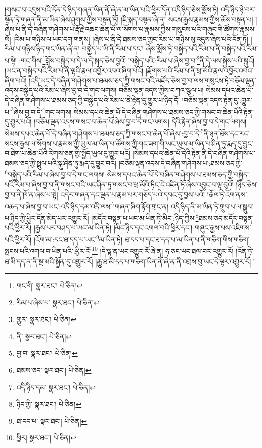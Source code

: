 །གསང་བ་འདུས་པའི་དོན་དེ་ཉིད་གཞན་ཡིན་ནོ་ཞེ་ན་མ་ཡིན་པའི་ཕྱིར་དོན་འདི་ཉིད་ཅེས་སྨོས་ཏེ། འདི་ཉིད་ཉེ་བར་སྟོན་ཏེ་གཞན་ནི་མ་ཡིན་ཞེས་ཤུགས་ཀྱིས་བསྟན་ཏོ། །ཇི་སྐད་བསྟན་ཞེ་ན། སངས་རྒྱས་རྣམས་ཀྱིས་ཆོས་བསྟན་པ། །ཞེས་པ་ནི་དེ་བཞིན་གཤེགས་པ་རྡོ་རྗེ་འཆང་ཆེན་པོ་ལ་སོགས་པ་རྣམས་ཀྱིས་གསུངས་པའི་གཞུང་གི་ཚོགས་རྣམས་སོ། །རིམ་པ་གཉིས་ལ་ཡང་དག་གནས། །ཞེས་པ་ནི་དེ་ཐམས་ཅད་ཀྱང་རིམ་པ་གཉིས་སུ་འདུས་ཞེས་པའི་དོན་ཏོ། །རིམ་པ་གཉིས་ཉིད་གང་ཡིན་ཞེ་ན། བསྐྱེད་པ་ཡི་ནི་རིམ་པ་དང་། ཞེས་སྨོས་ཏེ་བསྐྱེད་པའི་རིམ་པ་ནི་བསྐྱེད་པའི་རིམ་པ་སྟེ། :གང་གིས་\footnote{གང་གི་  སྣར་ཐང་།  པེ་ཅིན། }བློས་བསྐྱེད་པ་དེ་ལ་དེ་སྐད་ཅེས་བྱའོ། །བསྐྱེད་པའི་:རིམ་པ་ཞེས་བྱ་བ་\footnote{རིམ་པ་ཞེས་པ་  སྣར་ཐང་།  པེ་ཅིན། }ནི་དེ་ལས་སྐྱེས་པའི་སྐུའོ། །ཡང་ན་བསྐྱེད་པའི་རིམ་པ་ནི་ལྷའི་རྣལ་འབྱོར་འབའ་ཞིག་པའོ། །རྫོགས་པའི་རིམ་པ་ནི་ཕྲ་མོའི་རྣལ་འབྱོར་འབའ་ཞིག་པའོ། །འདི་ཡང་དེ་བཞིན་གཤེགས་པ་ཐམས་ཅད་ཀྱི་གསང་བའི་མཛོད་ཅེས་བྱ་བ་ལས་གསུངས་ཏེ་བཅོམ་ལྡན་འདས་བསྐྱེད་པའི་རིམ་པ་ཞེས་བྱ་བ་དེ་གང་ལགས། བཅོམ་ལྡན་འདས་ཀྱིས་བཀའ་སྩལ་པ། སེམས་དཔའ་ཆེན་པོ་དེ་བཞིན་གཤེགས་པ་ཐམས་ཅད་ཀྱི་བསྐྱེད་པའི་རིམ་པ་ནི་རྟེན་དུ་གྱུར་པ་ཉིད་དོ། །བཅོམ་ལྡན་འདས་རྟེན་དུ་:གྱུར་པ་\footnote{གྱུར་  སྣར་ཐང་།  པེ་ཅིན། }ཞེས་བྱ་བ་དེ་\footnote{ནི་  སྣར་ཐང་།  པེ་ཅིན། }གང་ལགས། སེམས་དཔའ་ཆེན་པོ་དེ་བཞིན་གཤེགས་པ་ཐམས་ཅད་ཀྱི་གསང་བ་ཆེན་པོའི་རྟེན་དུ་གྱུར་པའོ། །བཅོམ་ལྡན་འདས་གསང་བ་ཆེན་པོ་ཞེས་བྱ་བ་དེ་གང་ལགས། དེའི་རྟེན་ཞེས་བྱ་བ་དེ་གང་ལགས། སེམས་དཔའ་ཆེན་པོ་དེ་བཞིན་གཤེགས་པ་ཐམས་ཅད་ཀྱི་གསང་བ་ཆེན་པོ་ཞེས་:བྱ་བ་དེ་\footnote{བྱ་བ་  སྣར་ཐང་།  པེ་ཅིན། }ནི་ཉན་ཐོས་དང་རང་སངས་རྒྱས་ལ་སོགས་པ་རྣམས་ཀྱི་ཡུལ་མ་ཡིན་པ་ཚོགས་ཀྱི་གང་ཟག་གི་ཡང་ཡུལ་མ་ཡིན་པ་ཤིན་ཏུ་རྨད་དུ་བྱུང་བ་ཐེག་པ་ཆེན་པོའི་རིགས་ཅན་གྱི་སྤྱོད་ཡུལ་དུ་གྱུར་པའོ། །སེམས་དཔའ་ཆེན་པོ་དེའི་རྟེན་ནི་དེ་བཞིན་གཤེགས་པ་ཐམས་ཅད་ཀྱི་སྤྲུལ་པའི་སྐུ་ཤིན་ཏུ་རྨད་དུ་བྱུང་བའོ། །བཅོམ་ལྡན་འདས་དེ་བཞིན་གཤེགས་པ་:ཐམས་ཅད་ཀྱི་\footnote{ཐམས་ཅད་  སྣར་ཐང་།  པེ་ཅིན། }བསྐྱེད་པའི་རིམ་པ་ཞེས་བྱ་བ་དེ་གང་ལགས། སེམས་དཔའ་ཆེན་པོ་དེ་བཞིན་གཤེགས་པ་ཐམས་ཅད་ཀྱི་བསྐྱེད་པའི་རིམ་པ་ཞེས་བྱ་བ་ནི་གསང་བའི་ཡང་ཤིན་ཏུ་གསང་བ་ཕྲ་མོའི་ཏིང་ངེ་འཛིན་ཏོ་ཞེས་འབྱུང་བ་ལྟ་བུའོ། །ཉིད་ཅེས་བྱ་བ་ནི་ཁོ་ན་ཞེས་པ་སྟེ། འདིར་གཞན་དང་ལྡན་པ་རྣམ་པར་གཅོད་པའི་དབང་དུ་བྱས་པའོ། །རྒོལ་ཏེ་འོག་ནས་འཆད་པ་ཞེས་བྱ་བ་ཡང་:འདི་ཉིད་དམ་འདི་ལས་\footnote{འདི་ཉིད་དམ་  སྣར་ཐང་།  པེ་ཅིན། }གཞན་ཞིག་རྟོག་གྲང་ན། འདི་ཉིད་ནི་མ་ཡིན་ཏེ་གྲུབ་པ་ལ་སྒྲུབ་པ་ཉིད་ཀྱི་ཕྱིར་དོན་མེད་པར་འགྱུར་རོ། །མདོར་བསྟན་པ་ཡང་མ་ཡིན་ཏེ་མིང་:ཉིད་ཀྱིས་\footnote{ཉིད་ཀྱི་  སྣར་ཐང་།  པེ་ཅིན། }ཐམས་ཅད་མདོར་བསྟན་པའི་ཕྱིར་རོ། །རྒྱས་པར་བཤད་པ་ཡང་མ་ཡིན་ཏེ། །མིང་ཉིད་དང་འགལ་བའི་ཕྱིར་དང་། གཞུང་རྒྱས་པས་འཇིགས་པའི་ཕྱིར་རོ། །འོག་མ་:དང་ཐ་དད་པ་ཡང་\footnote{ཐ་དད་པ་  སྣར་ཐང་།  པེ་ཅིན། }མ་ཡིན་ཏེ། ཐ་དད་པ་དང་ཐ་དད་པ་མ་ཡིན་པ་ནི་གཅིག་གིས་གཅིག་སྤངས་པའི་འགལ་བ་ཡིན་པའི་:ཕྱིར་རོ།\footnote{ཕྱིར།  སྣར་ཐང་།  པེ་ཅིན། } །དེ་ལྟ་ན་ཡང་འགྱུར་རོ་ཞེ་ན། ཧ་ཅང་ཡང་ཐལ་བར་འགྱུར་རོ། །འོན་ཏེ་ཐ་མི་དད་ན་ནི་སྔ་མའི་སྐྱོན་དུ་འགྱུར་རོ། །རྒྱུ་ཐ་མི་དད་པ་གཅིག་ཡིན་ནོ་ཞེ་ན་ནི་འབྲས་བུ་ཡང་དེ་ལྟར་འགྱུར་རོ། །
